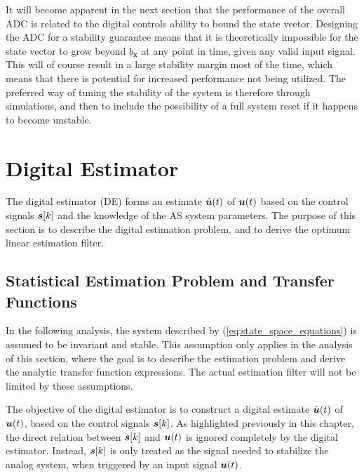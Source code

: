 It will become apparent in the next section that the performance of the overall ADC is related to the digital controls ability to bound the state vector. Designing the ADC for a stability guarantee means that it is theoretically impossible for the state vector to grow beyond $b_{\bm{x}}$ at any point in time, given any valid input signal. This will of course result in a large stability margin most of the time, which means that there is potential for increased performance not being utilized. The preferred way of tuning the stability of the system is therefore through simulations, and then to include the possibility of a full system reset if it happens to become unstable.




















\section{Digital Estimator}
The digital estimator (DE) forms an estimate $\hat{\bm{u}}(t)$ of $\bm{u}(t)$ based on the control signals $\bm{s}[k]$ and the knowledge of the AS system parameters. The purpose of this section is to describe the digital estimation problem, and to derive the optimum linear estimation filter.

\subsection{Statistical Estimation Problem and Transfer Functions}
In the following analysis, the system described by (\ref{eq:state_space_equations}) is assumed to be invariant and stable. This assumption only applies in the analysis of this section, where the goal is to describe the estimation problem and derive the analytic transfer function expressions. The actual estimation filter will not be limited by these assumptions.

The objective of the digital estimator is to construct a digital estimate $\hat{\bm{u}}(t)$ of $\bm{u}(t)$, based on the control signals $\bm{s}[k]$. As highlighted previously in this chapter, the direct relation between $\bm{s}[k]$ and $\bm{u}(t)$ is ignored completely by the digital estimator. Instead, $\bm{s}[k]$ is only treated as the signal needed to stabilize the analog system, when triggered by an input signal $\bm{u}(t)$.

